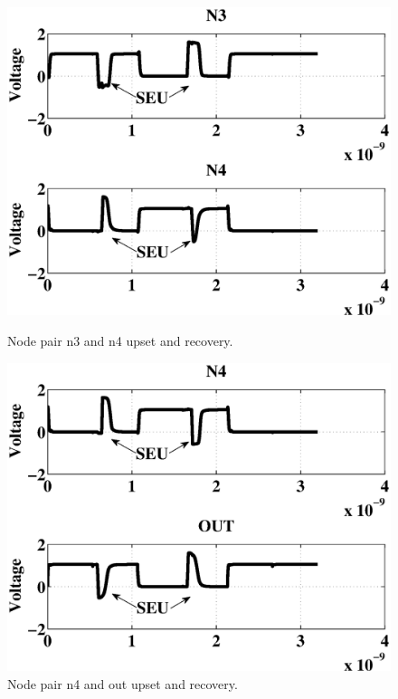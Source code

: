 \begin{figure}[!htbp]
	\centering
	\parbox{4cm}{
		\includegraphics[width=\linewidth]{Figures/WavePlots/n3n4.eps}
		\caption{Node pair n3 and n4 upset and recovery.}
		\label{fig:n3n4}}
	\qquad
	\begin{minipage}{4cm}
		\includegraphics[width=\linewidth]{Figures/WavePlots/n4out.eps}
		\caption{Node pair n4 and out upset and recovery.}
		\label{fig:n4out}
	\end{minipage}
\end{figure}

